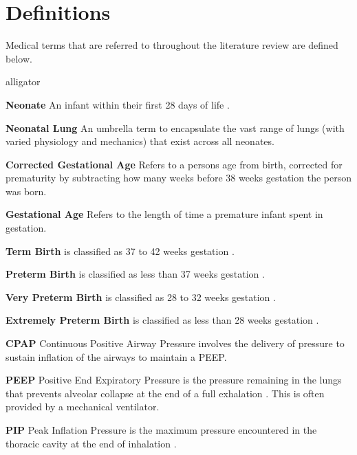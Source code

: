 \documentclass[12pt, openany, oneside]{book}
\begin{document}
\section{Definitions}
Medical terms that are referred to throughout the literature review are defined below.

\begin{labeling}{alligator}


\item[\textbf{Neonate}] An infant within their first 28 days of life  \citep{who}.

\item[\textbf{Neonatal Lung}] An umbrella term to encapsulate the vast range of lungs (with varied physiology and mechanics) that exist across all neonates.

\item[\textbf{Corrected Gestational Age}] Refers to a persons age from birth, corrected for prematurity by subtracting how many weeks before 38 weeks gestation the person was born.

\item[\textbf{Gestational Age}] Refers to the length of time a premature infant spent in gestation.

\item [\textbf{Term Birth}] is classified as 37 to 42 weeks gestation \citep{glass2015outcomes}.

\item[\textbf{Preterm Birth}] is classified as less than 37 weeks gestation \citep{glass2015outcomes}.

\item[\textbf{Very Preterm Birth}] is classified as 28 to 32 weeks gestation \citep{glass2015outcomes}.

\item [\textbf{Extremely Preterm Birth}] is classified as less than 28 weeks gestation \citep{glass2015outcomes}.

\item[\textbf{CPAP}] Continuous Positive Airway Pressure involves the delivery of pressure to sustain inflation of the airways to maintain a PEEP.

\item[\textbf{PEEP}] Positive End Expiratory Pressure is the pressure remaining in the lungs that prevents alveolar collapse at the end of a full exhalation \citep{sail}. This is often provided by a mechanical ventilator.

\item[\textbf{PIP}] Peak Inflation Pressure is the maximum pressure encountered in the thoracic cavity at the end of inhalation \citep{sail}.


\end{labeling}
\end{document}
